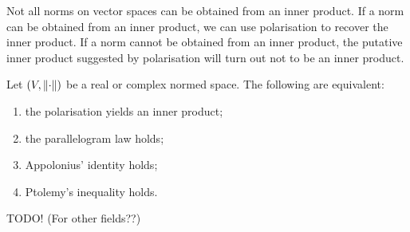 Not all norms on vector spaces can be obtained from an inner product. If a norm can be obtained from an inner product, we can use polarisation to recover the inner product. If a norm cannot be obtained from an inner product, the putative inner product suggested by polarisation will turn out not to be an inner product.
\begin{theorem}
Let $\left( V,\lVert\cdot\rVert \right)$ be a real or complex normed space. The following are equivalent:
\begin{enumerate}
\item the polarisation yields an inner product;
\item the parallelogram law holds;
\item Appolonius' identity holds;
\item Ptolemy's inequality holds.
\end{enumerate}
\end{theorem}
TODO! (For other fields??)
